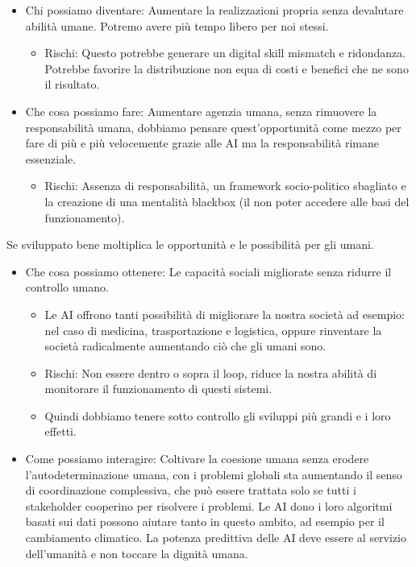 \documentclass[a4page, 11pt]{article}
\begin{document}
\begin{itemize}
	\item
	Chi possiamo diventare: Aumentare la realizzazioni propria senza
	devalutare abilità umane. Potremo avere più tempo libero per noi
	stessi.
	
	\begin{itemize}
		 
		\item
		Rischi: Questo potrebbe generare un digital skill mismatch e
		ridondanza. Potrebbe favorire la distribuzione non equa di costi e
		benefici che ne sono il risultato. 
	\end{itemize}
	\item
	Che cosa possiamo fare: Aumentare agenzia umana, senza rimuovere la
	responsabilità umana, dobbiamo pensare quest'opportunità come mezzo
	per fare di più e più velocemente grazie alle AI ma la responsabilità
	rimane essenziale.
	
	\begin{itemize}
		 
		\item
		Rischi: Assenza di responsabilità, un framework socio-politico
		sbagliato e la creazione di una mentalità blackbox
		(il non poter accedere alle basi del funzionamento).
	\end{itemize}
\end{itemize}

Se sviluppato bene moltiplica le opportunità e le possibilità per gli
umani.

\begin{itemize}
	\item
	Che cosa possiamo ottenere: Le capacità sociali migliorate senza
	ridurre il controllo umano.
	
	\begin{itemize}
		 
		\item
		Le AI offrono tanti possibilità di migliorare la nostra società ad
		esempio: nel caso di medicina, trasportazione e logistica, oppure
		rinventare la società radicalmente aumentando ciò che gli umani
		sono.
		\item
		Rischi: Non essere dentro o sopra il loop, riduce la nostra abilità
		di monitorare il funzionamento di questi sistemi.
		\item
		Quindi dobbiamo tenere sotto controllo gli sviluppi più grandi e i
		loro effetti.
	\end{itemize}
	\item
	Come possiamo interagire: Coltivare la coesione umana senza erodere
	l'autodeterminazione umana, con i problemi globali sta aumentando il
	senso di coordinazione complessiva, che può essere trattata solo se
	tutti i stakeholder cooperino per risolvere i problemi. Le AI dono i
	loro algoritmi basati sui dati possono aiutare tanto in questo ambito,
	ad esempio per il cambiamento climatico. La potenza predittiva delle
	AI deve essere al servizio dell'umanità e non toccare la dignità
	umana.
\end{itemize}
\end{document}
